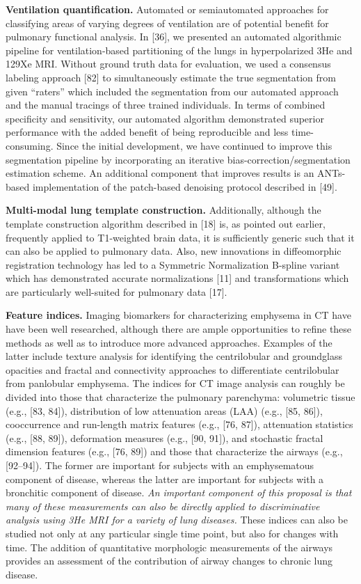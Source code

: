 \documentclass[11pt,]{article}
\begin{document}
\textbf{Ventilation quantification.} Automated or semiautomated
approaches for classifying areas of varying degrees of ventilation are
of potential benefit for pulmonary functional analysis. In {[}36{]}, we
presented an automated algorithmic pipeline for ventilation-based
partitioning of the lungs in hyperpolarized 3He and 129Xe MRI. Without
ground truth data for evaluation, we used a consensus labeling approach
{[}82{]} to simultaneously estimate the true segmentation from given
``raters'' which included the segmentation from our automated approach
and the manual tracings of three trained individuals. In terms of
combined specificity and sensitivity, our automated algorithm
demonstrated superior performance with the added benefit of being
reproducible and less time-consuming. Since the initial development, we
have continued to improve this segmentation pipeline by incorporating an
iterative bias-correction/segmentation estimation scheme. An additional
component that improves results is an ANTs-based implementation of the
patch-based denoising protocol described in {[}49{]}.

\textbf{Multi-modal lung template construction.} Additionally, although
the template construction algorithm described in {[}18{]} is, as pointed
out earlier, frequently applied to T1-weighted brain data, it is
sufficiently generic such that it can also be applied to pulmonary data.
Also, new innovations in diffeomorphic registration technology has led
to a Symmetric Normalization B-spline variant which has demonstrated
accurate normalizations {[}11{]} and transformations which are
particularly well-suited for pulmonary data {[}17{]}.

\textbf{Feature indices.} Imaging biomarkers for characterizing
emphysema in CT have have been well researched, although there are ample
opportunities to refine these methods as well as to introduce more
advanced approaches. Examples of the latter include texture analysis for
identifying the centrilobular and groundglass opacities and fractal and
connectivity approaches to differentiate centrilobular from panlobular
emphysema. The indices for CT image analysis can roughly be divided into
those that characterize the pulmonary parenchyma: volumetric tissue
(e.g., {[}83, 84{]}), distribution of low attenuation areas (LAA) (e.g.,
{[}85, 86{]}), cooccurrence and run-length matrix features (e.g., {[}76,
87{]}), attenuation statistics (e.g., {[}88, 89{]}), deformation
measures (e.g., {[}90, 91{]}), and stochastic fractal dimension features
(e.g., {[}76, 89{]}) and those that characterize the airways (e.g.,
{[}92--94{]}). The former are important for subjects with an
emphysematous component of disease, whereas the latter are important for
subjects with a bronchitic component of disease. \emph{An important
component of this proposal is that many of these measurements can also
be directly applied to discriminative analysis using 3He MRI for a
variety of lung diseases.} These indices can also be studied not only at
any particular single time point, but also for changes with time. The
addition of quantitative morphologic measurements of the airways
provides an assessment of the contribution of airway changes to chronic
lung disease.
\end{document}
